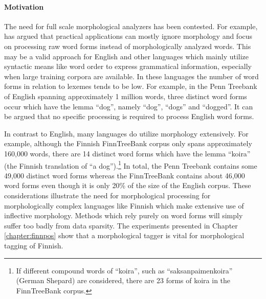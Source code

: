 \paragraph{Motivation} The need for full scale morphological analyzers
has been contested. For example, \cite{Church2005} has argued that
practical applications can mostly ignore morphology and focus on
processing raw word forms instead of morphologically analyzed
words. This may be a valid approach for English and other languages
which mainly utilize syntactic means like word order to express
grammatical information, especially when large training corpora are
available. In these languages the number of word forms in relation to
lexemes tends to be low. For example, in the Penn Treebank of English
\cite{Marcus1993} spanning approximately 1 million words, three
distinct word forms occur which have the lemma ``dog'', namely
``dog'', ``dogs'' and ``dogged''. It can be argued that no specific
processing is required to process English word forms.

In contrast to English, many languages do utilize morphology
extensively. For example, although the Finnish FinnTreeBank corpus
\citep{Voutilainen2011} only spans approximately 160,000 words, there
are 14 distinct word forms which have the lemma ``koira'' (the Finnish
translation of ``a dog'').\footnote{If different compound words of
  ``koira'', such as ``saksanpaimenkoira'' (German Shepard) are
  considered, there are 23 forms of koira in the FinnTreeBank corpus.}
In total, the Penn Treebank contains some 49,000 distinct word forms
whereas the FinnTreeBank contains about 46,000 word forms even though
it is only 20\% of the size of the English corpus. These
considerations illustrate the need for morphological processing for
morphologically complex languages like Finnish which make extensive use
of inflective morphology. Methods which rely purely on word forms will
simply suffer too badly from data sparsity. The experiments presented
in Chapter \ref{chapter:finnpos} show that a morphological tagger is
vital for morphological tagging of Finnish.

